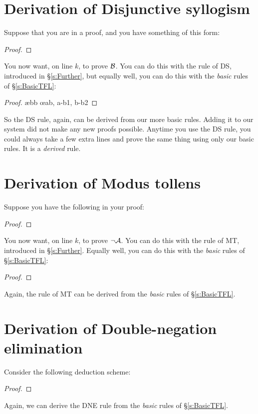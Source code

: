 \section{Derivation of Disjunctive syllogism}
Suppose that you are in a proof, and you have something of this form:
\begin{proof}
\end{proof}
You now want, on line $k$, to prove $\mathcal{B}$. You can do this with the rule of DS, introduced in \S\ref{s:Further}, but equally well, you can do this with the \emph{basic} rules of \S\ref{s:BasicTFL}:
	\begin{proof}
		\open
		\close
		\open
			\ae{bb}
		\close
	\oe{ab, a-b1, b-b2}
\end{proof}
So the DS rule, again, can be derived from our more basic rules. Adding it to our system did not make any new proofs possible. Anytime you use the DS rule, you could always take a few extra lines and prove the same thing using only our basic rules. It is a \emph{derived} rule.

\section{Derivation of Modus tollens}
Suppose you have the following in your proof:
\begin{proof}
\end{proof}
You now want, on line $k$, to prove $\neg \mathcal{A}$. You can do this with the rule of MT, introduced in \S\ref{s:Further}. Equally well, you can do this with the \emph{basic} rules of \S\ref{s:BasicTFL}:
\begin{proof}
		\open
		\close
\end{proof}
Again, the rule of MT can be derived from the \emph{basic} rules of \S\ref{s:BasicTFL}.

\section{Derivation of Double-negation elimination}
Consider the following deduction scheme:
	\begin{proof}
	\open
	\close
	\open
	\close
\end{proof}
Again,  we can derive the DNE rule from the \emph{basic} rules of \S\ref{s:BasicTFL}.

